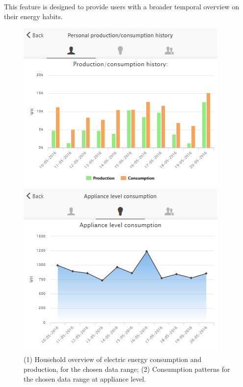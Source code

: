 This feature is designed to provide users with a broader temporal overview on their energy habits.
\begin{figure}
      \begin{center}
        \begin{minipage}[htb]{0.45\linewidth}    
         \includegraphics[width=1\linewidth]{img/historicalcomparison_prodcons.png}
        \end{minipage}
	\hfill 
        \begin{minipage}[htb]{0.45\linewidth}    
         \includegraphics[width=1\linewidth]{img/applianceconsumption.png}
        \end{minipage}
      \end{center}
      \caption{(1) Household overview of electric energy consumption and production, for the chosen data range; (2) Consumption patterns for the chosen data range at appliance level.
}
\label{fig:viz_hist}
\end{figure}
